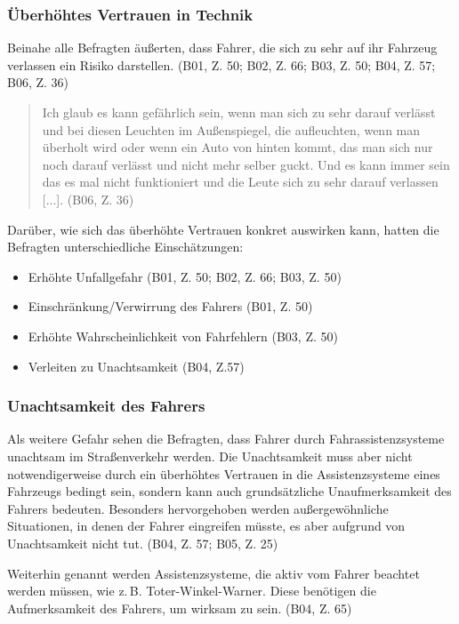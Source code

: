 \documentclass[12pt]{article}
\begin{document}
\subsubsection*{Überhöhtes Vertrauen in Technik}
Beinahe alle Befragten äußerten, dass Fahrer, die sich zu sehr auf ihr Fahrzeug verlassen ein Risiko darstellen. (B01, Z. 50; B02, Z. 66; B03, Z. 50; B04, Z. 57; B06, Z. 36)

\begin{quote}
    Ich glaub es kann gefährlich sein, wenn man sich zu sehr darauf verlässt und bei diesen Leuchten im Außenspiegel, die aufleuchten, wenn man überholt wird oder wenn ein Auto von hinten kommt, das man sich nur noch darauf verlässt und nicht mehr selber guckt. Und es kann immer sein das es mal nicht funktioniert und die Leute sich zu sehr darauf verlassen [...]. (B06, Z. 36)
\end{quote}

Darüber, wie sich das überhöhte Vertrauen konkret auswirken kann, hatten die Befragten unterschiedliche Einschätzungen:
\begin{itemize}
    \item Erhöhte Unfallgefahr (B01, Z. 50; B02, Z. 66; B03, Z. 50)
    \item Einschränkung/Verwirrung des Fahrers (B01, Z. 50)
    \item Erhöhte Wahrscheinlichkeit von Fahrfehlern (B03, Z. 50)
    \item Verleiten zu Unachtsamkeit (B04, Z.57)
\end{itemize}

\subsubsection*{Unachtsamkeit des Fahrers}
Als weitere Gefahr sehen die Befragten, dass Fahrer durch Fahrassistenzsysteme unachtsam im Straßenverkehr werden. Die Unachtsamkeit muss aber nicht notwendigerweise durch ein überhöhtes Vertrauen in die Assistenzsysteme eines Fahrzeugs bedingt sein, sondern kann auch grundsätzliche Unaufmerksamkeit des Fahrers bedeuten. Besonders hervorgehoben werden außergewöhnliche Situationen, in denen der Fahrer eingreifen müsste, es aber aufgrund von Unachtsamkeit nicht tut. (B04, Z. 57; B05, Z. 25)

Weiterhin genannt werden Assistenzsysteme, die aktiv vom Fahrer beachtet werden müssen, wie z.\,B. Toter-Winkel-Warner. Diese benötigen die Aufmerksamkeit des Fahrers, um wirksam zu sein. (B04, Z. 65)
\end{document}
